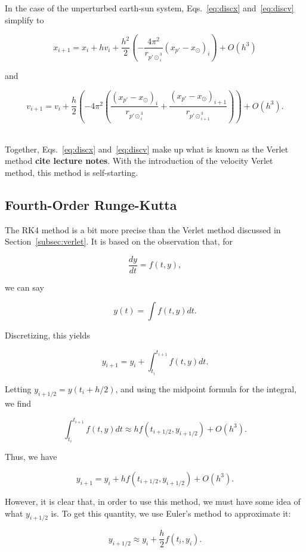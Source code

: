 \documentclass[12pt]{article}
\numberwithin{equation}{section}
\begin{document}
\noindent In the case of the unperturbed earth-sun system, Eqs.~\ref{eq:discx} and~\ref{eq:discv} simplify to

$$
x_{i+1} =  x_{i}+hv_{i}+\frac{h^{2}}{2}\left(-\frac{4\pi^{2}}{r_{p\prime\odot}_{i}^{3}}\left(x_{p\prime}-x_{\odot}\right)_{i}\right)+O\left(h^{3}\right)
$$

\noindent and

$$
v_{i+1} =  v_{i}+\frac{h}{2}\left(-4\pi^{2}\left(\frac{\left(x_{p\prime}-x_{\odot}\right)_{i}}{r_{p\prime\odot}_{i}^{3}}+\frac{\left(x_{p\prime}-x_{\odot}\right)_{i+1}}{r_{p\prime\odot}_{i+1}^{3}}\right)\right)+O\left(h^{3}\right).
$$

\\\indent Together, Eqs.~\ref{eq:discx} and~\ref{eq:discv} make up what is known as the Verlet method \textbf{cite lecture notes}.  With the introduction of the velocity Verlet method, this method is self-starting.

\subsection{Fourth-Order Runge-Kutta}
\label{subsec:rk4}

The RK4 method is a bit more precise than the Verlet method discussed in Section~\ref{subsec:verlet}.  It is based on the observation that, for

$$
\frac{dy}{dt} = f\left(t,y\right),
$$

\noindent we can say

$$
y\left(t\right) = \int f\left(t,y\right)dt.
$$

\noindent Discretizing, this yields

$$
y_{i+1}=y_{i} + \int_{t_{i}}^{t_{i+1}}f\left(t,y\right)dt.
$$

\noindent Letting $y_{i+1/2} = y\left(t_{i}+h/2\right)$, and using the midpoint formula for the integral, we find 

$$
\int_{t_{i}}^{t_{i+1}}f\left(t,y\right)dt \approx hf\left(t_{i+1/2},y_{i+1/2}\right)+O\left(h^{3}\right).
$$

\noindent Thus, we have

$$
y_{i+1}=y_{i} +  hf\left(t_{i+1/2},y_{i+1/2}\right)+O\left(h^{3}\right).
$$

\noindent However, it is clear that, in order to use this method, we must have some idea of what $y_{i+1/2}$ is.  To get this quantity, we use Euler's method to approximate it:

$$
y_{i+1/2} \approx y_{i}+\frac{h}{2}f\left(t_{i},y_{i}\right).
$$
\end{document}
